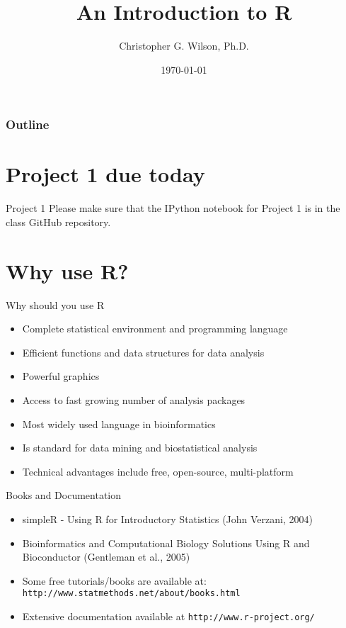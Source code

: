 \documentclass{beamer}
\title[]{An Introduction to R}
\author[]{Christopher G. Wilson, Ph.D.}
\date{\today}
\institute[LLU]{Loma Linda University\\
Dept. of Pediatrics and Center for Perinatal Biology}
\begin{document}
\begin{frame}
\titlepage
\end{frame}

\begin{frame}
\frametitle{Outline}
\tableofcontents
\end{frame}

\section[]{Project 1 due today}
\begin{frame}{Project 1}
Please make sure that the IPython notebook for Project 1 is 
in the class GitHub repository.
\end{frame}

\section[]{Why use R?}
\begin{frame}{Why should you use R}
\begin{itemize}
\item Complete statistical environment and programming language 
\item Efficient functions and data structures for data analysis 
\item Powerful graphics
\item Access to fast growing number of analysis packages
\item Most widely used language in bioinformatics
\item Is standard for data mining and biostatistical analysis 
\item Technical advantages include free, open-source, multi-platform
\end{itemize} 
\end{frame}

\begin{frame}{Books and Documentation}
\begin{itemize}
\item simpleR - Using R for Introductory Statistics (John Verzani, 2004) 
\item Bioinformatics and Computational Biology Solutions Using R and Bioconductor (Gentleman et al., 2005)
\item Some free tutorials/books are available at: \texttt{http://www.statmethods.net/about/books.html}
\item Extensive documentation available at \texttt{http://www.r-project.org/}
\end{itemize} 
\end{frame}
\end{document}
